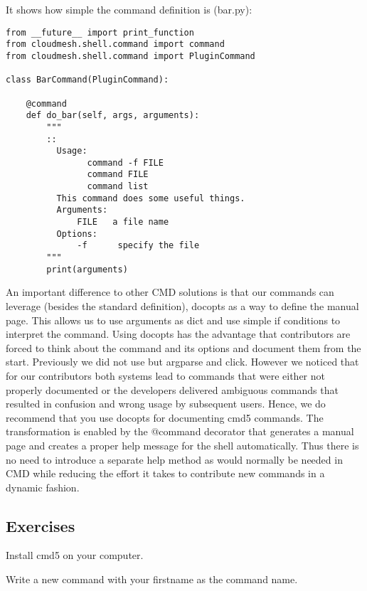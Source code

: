 It shows how simple the command definition is (bar.py):

\begin{verbatim}
from __future__ import print_function
from cloudmesh.shell.command import command
from cloudmesh.shell.command import PluginCommand

class BarCommand(PluginCommand):

    @command
    def do_bar(self, args, arguments):
        """
        ::
          Usage:
                command -f FILE
                command FILE
                command list
          This command does some useful things.
          Arguments:
              FILE   a file name
          Options:
              -f      specify the file
        """
        print(arguments)
\end{verbatim}

An important difference to other CMD solutions is that our commands can
leverage (besides the standard definition), docopts as a way to define
the manual page. This allows us to use arguments as dict and use simple
if conditions to interpret the command. Using docopts has the advantage
that contributors are forced to think about the command and its options
and document them from the start. Previously we did not use but argparse
and click. However we noticed that for our contributors both systems
lead to commands that were either not properly documented or the
developers delivered ambiguous commands that resulted in confusion and
wrong usage by subsequent users. Hence, we do recommend that you use
docopts for documenting cmd5 commands. The transformation is enabled by
the @command decorator that generates a manual page and creates a proper
help message for the shell automatically. Thus there is no need to
introduce a separate help method as would normally be needed in CMD
while reducing the effort it takes to contribute new commands in a
dynamic fashion.

\subsection{Exercises}

\begin{exercise}
\label{E:CMD5.1:}
Install cmd5 on your computer.
\end{exercise}

\begin{exercise}
\label{E:CMD5.2:}
Write a new command with your firstname as the command name.
\end{exercise}

